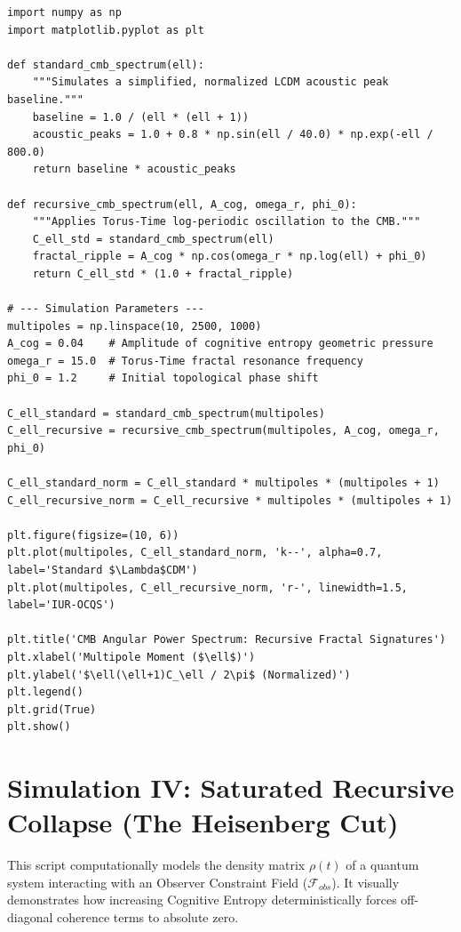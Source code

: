 \documentclass[12pt,openany]{book}
\begin{document}
\begin{verbatim}
import numpy as np
import matplotlib.pyplot as plt

def standard_cmb_spectrum(ell):
    """Simulates a simplified, normalized LCDM acoustic peak baseline."""
    baseline = 1.0 / (ell * (ell + 1))
    acoustic_peaks = 1.0 + 0.8 * np.sin(ell / 40.0) * np.exp(-ell / 800.0)
    return baseline * acoustic_peaks

def recursive_cmb_spectrum(ell, A_cog, omega_r, phi_0):
    """Applies Torus-Time log-periodic oscillation to the CMB."""
    C_ell_std = standard_cmb_spectrum(ell)
    fractal_ripple = A_cog * np.cos(omega_r * np.log(ell) + phi_0)
    return C_ell_std * (1.0 + fractal_ripple)

# --- Simulation Parameters ---
multipoles = np.linspace(10, 2500, 1000) 
A_cog = 0.04    # Amplitude of cognitive entropy geometric pressure
omega_r = 15.0  # Torus-Time fractal resonance frequency
phi_0 = 1.2     # Initial topological phase shift

C_ell_standard = standard_cmb_spectrum(multipoles)
C_ell_recursive = recursive_cmb_spectrum(multipoles, A_cog, omega_r, phi_0)

C_ell_standard_norm = C_ell_standard * multipoles * (multipoles + 1)
C_ell_recursive_norm = C_ell_recursive * multipoles * (multipoles + 1)

plt.figure(figsize=(10, 6))
plt.plot(multipoles, C_ell_standard_norm, 'k--', alpha=0.7, label='Standard $\Lambda$CDM')
plt.plot(multipoles, C_ell_recursive_norm, 'r-', linewidth=1.5, label='IUR-OCQS')

plt.title('CMB Angular Power Spectrum: Recursive Fractal Signatures')
plt.xlabel('Multipole Moment ($\ell$)')
plt.ylabel('$\ell(\ell+1)C_\ell / 2\pi$ (Normalized)')
plt.legend()
plt.grid(True)
plt.show()
\end{verbatim}

\section{Simulation IV: Saturated Recursive Collapse (The Heisenberg Cut)}
This script computationally models the density matrix $\rho(t)$ of a quantum system interacting with an Observer Constraint Field ($\mathcal{F}_{obs}$). It visually demonstrates how increasing Cognitive Entropy deterministically forces off-diagonal coherence terms to absolute zero.
\end{document}
